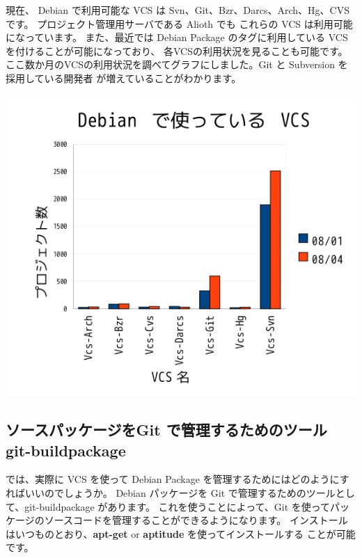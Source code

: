 \documentclass[mingoth,a4paper]{jsarticle}
\begin{document}
現在、 Debian で利用可能な VCS は Svn、Git、Bzr、Darcs、Arch、Hg、CVS です。
プロジェクト管理用サーバである Alioth でも
これらの VCS は利用可能になっています。
また、最近では Debian Package のタグに利用している VCS を付けることが可能になっており、
各VCSの利用状況を見ることも可能です。 
ここ数か月のVCSの利用状況を調べてグラフにしました。Git と Subversion を採用している開発者
が増えていることがわかります。
\begin{center}
\includegraphics[width=0.5\hsize]{image200804/debian-vcs-200804.png}
\end{center}

\subsection{ソースパッケージをGit で管理するためのツール git-buildpackage}
では、実際に VCS を使って Debian Package を管理するためにはどのようにすればいいのでしょうか。
Debian パッケージを Git で管理するためのツールとして、git-buildpackage があります。
これを使うことによって、Git を使ってパッケージのソースコードを管理することができるようになります。
インストールはいつものとおり、{\bf apt-get} or {\bf aptitude} を使ってインストールする
ことが可能です。

\end{document}
